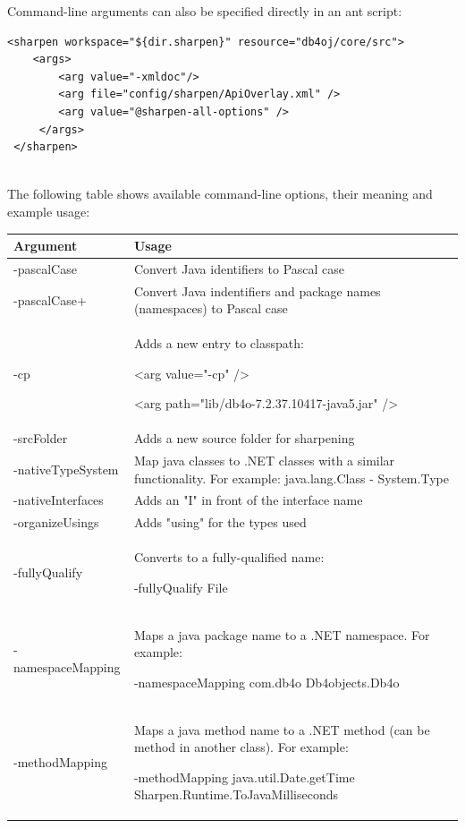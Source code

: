 Command-line arguments can also be specified directly in an ant script:

\begin{lstlisting}
<sharpen workspace="${dir.sharpen}" resource="db4oj/core/src">
    <args>
        <arg value="-xmldoc"/>
        <arg file="config/sharpen/ApiOverlay.xml" />       
        <arg value="@sharpen-all-options" />
     </args>
 </sharpen>
        
\end{lstlisting}

The following table shows available command-line options, their meaning and example usage:

{\small
\begin{longtable}{|p{}|p{}|}
\hline
\textbf{Argument} & \textbf{Usage} \\ \hline
-pascalCase & Convert Java identifiers to Pascal case \\ \hline
-pascalCase+ & Convert Java indentifiers and package names (namespaces) to Pascal case \\ \hline
-cp & Adds a new entry to classpath:\par \textless{}arg value="-cp" /\textgreater{}\par \textless{}arg path="lib/db4o-7.2.37.10417-java5.jar" /\textgreater{} \\ \hline
-srcFolder & Adds a new source folder for sharpening \\ \hline
-nativeTypeSystem & Map java classes to .NET classes with a similar functionality. For example: java.lang.Class - System.Type \\ \hline
-nativeInterfaces & Adds an "I" in front of the interface name \\ \hline
-organizeUsings & Adds "using" for the types used \\ \hline
-fullyQualify & Converts to a fully-qualified name:\par -fullyQualify File \\ \hline
-namespaceMapping & Maps a java package name to a .NET namespace. For example:\par -namespaceMapping com.db4o Db4objects.Db4o \\ \hline
-methodMapping & Maps a java method name to a .NET method (can be method in another class). For example:\par -methodMapping java.util.Date.getTime Sharpen.Runtime.ToJavaMilliseconds \\ \hline

\end{longtable}}
